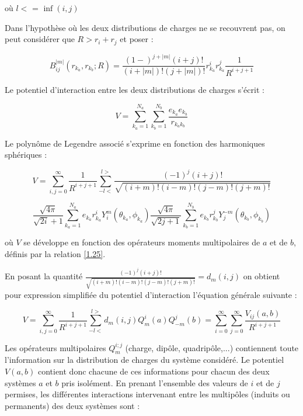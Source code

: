 	\noindent où $l<$ = $\inf (i,j)$
	
	
	Dans l'hypothèse où les deux distributions de charges ne se recouvrent pas, on peut considérer que $R> r_{i} +r_{j}$ et poser : 
	
	\begin{equation}
	B_{ij}^{|m|}(r_{k_{a}}, r_{k_{b}}; R) = \frac{(1-)^{j+|m|} (i+j)!}{(i+|m|)! (j+|m|)!} r^{i}_{k_{a}} r_{k_{a}}^{j} \frac{1}{R^{i+j+1}}
	\end{equation}
	
	Le potentiel d'interaction entre les deux distributions de charges s'écrit : 
	
	\begin{equation}
	V = \sum_{k_{a}=1}^{N_{a}} \sum_{k_{b}=1}^{N_{b}} \frac{e_{k_{a}}e_{k_{b}}}{r_{k_{a}k_{b}}}
	\end{equation}
	
	
	Le polynôme de Legendre associé s'exprime en fonction des harmoniques sphériques : 
	
	\begin{equation}
	V = \sum_{i,j=0}^{\infty} \frac{1}{R^{i+j+1}} \sum_{-l<}^{l>} \frac{(-1)^{j} (i+j)!} {\sqrt{(i+m)! (i-m)! (j-m)! (j+m)!}}
	\end{equation}
	
	\begin{equation}
	\frac{\sqrt{4\pi}}{\sqrt{2i}+ 1} \sum_{k_{a}=1}^{N_{a}} e_{k_{a}} r_{k_{a}}^{i} Y_{i}^{m} (\theta_{k_{a}},\phi_{k_{a}}) \frac{\sqrt{4\pi}}{\sqrt{2j+ 1}} \sum_{k_{b}=1}^{N_{b}} e_{k_{b}}r_{k_{b}}^{j} Y_{j}^{-m}(\theta_{k_{b}},\phi_{k_{b}})
	\end{equation}
	
	\noindent où $V$ se développe en fonction des opérateurs moments multipolaires de $a$ et de $b$, définis par la relation \ref{1.25}.
	
	En posant la quantité $\frac{(-1)^{j} (i+j)!} {\sqrt{(i+m)! (i-m)! (j-m)! (j+m)!}}=d_{m}(i,j)$ on obtient pour expression simplifiée du potentiel d'interaction l'équation générale suivante : 
	
	\begin{equation}
	V = \sum_{i,j=0}^{\infty} \frac{1}{R^{i+j+1}} \sum_{-l<}^{l>} d_{m}(i,j) Q_{m}^{i}(a) Q_{-m}^{j} (b) = \sum_{i=0}^{\infty} \sum_{j=0}^{\infty} \frac{V_{ij}(a,b)}{R^{i+j+1}} \label{1.33}
	\end{equation}
	
	Les opérateurs multipolaires $Q_{m}^{i;j}$ (charge, dipôle, quadripôle,...) contiennent toute l'information sur la distribution de charges du système considéré. Le potentiel $V(a,b)$ contient donc chacune de ces informations pour chacun des deux systèmes $a$ et $b$ pris isolément. En prenant l'ensemble des valeurs de $i$ et de $j$ permises, les différentes interactions intervenant entre les multipôles (induits ou permanents) des deux systèmes sont :
	
